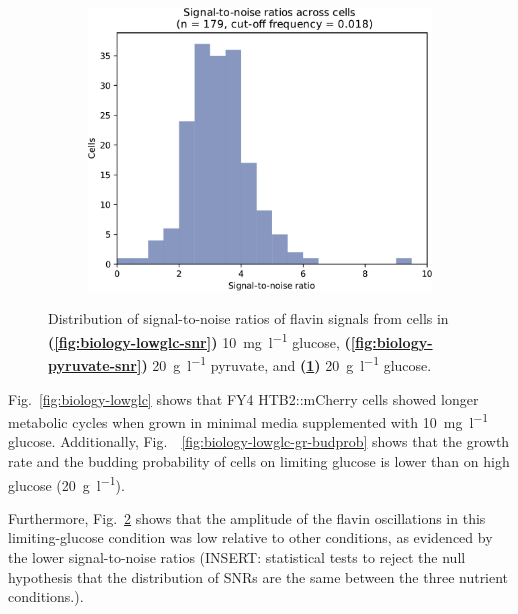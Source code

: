 \begin{figure}
  \begin{subfigure}[t]{0.3\textwidth}
   \centering
   \includegraphics[width=\textwidth]{glucose_snr_edit}
   \caption{
   }
   \label{fig:biology-highglc-snr}
  \end{subfigure}

  \caption{
    Distribution of signal-to-noise ratios of flavin signals from cells in
    \textbf{(\ref{fig:biology-lowglc-snr})}
    \SI{10}{\milli\gram~\litre^{-1}} glucose,
    \textbf{(\ref{fig:biology-pyruvate-snr})}
    \SI{20}{\gram~\litre^{-1}} pyruvate, and
    \textbf{(\ref{fig:biology-highglc-snr})}
    \SI{20}{\gram~\litre^{-1}} glucose.
  }
  \label{fig:biology-compare-snr}
\end{figure}


Fig.\ \ref{fig:biology-lowglc} shows that FY4 HTB2::mCherry cells showed longer metabolic cycles when grown in minimal media supplemented with \SI{10}{\milli\gram~\litre^{-1}} glucose.
Additionally, Fig.\ ~\ref{fig:biology-lowglc-gr-budprob} shows that the growth rate and the budding probability of cells on limiting glucose is lower than on high glucose (\SI{20}{\gram~\litre^{-1}}).

Furthermore, Fig.\ \ref{fig:biology-compare-snr} shows that the amplitude of the flavin oscillations in this limiting-glucose condition was low relative to other conditions, as evidenced by the lower signal-to-noise ratios (INSERT: statistical tests to reject the null hypothesis that the distribution of SNRs are the same between the three nutrient conditions.).


